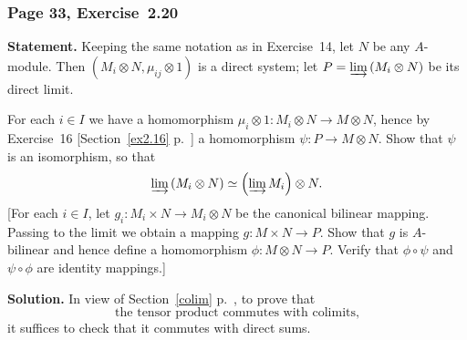 \documentclass[12pt,letterpaper]{article}%
\newcommand{\nn}{\noindent}
\begin{document}
\subsubsection{Page 33, Exercise~2.20}\label{ex2.20}%

\textbf{Statement.} Keeping the same notation as in Exercise~14, let $N$ be any $A$-module. Then $(M_i\otimes N,\mu_{ij}\otimes1)$ is a direct system; let $P=\varinjlim\,(M_i\otimes N)$ be its direct limit.

For each $i\in I$ we have a homomorphism $\mu_i\otimes1:M_i\otimes N\to M\otimes N$, hence by Exercise~16 [Section~\ref{ex2.16} p.~\pageref{ex2.16}] a homomorphism $\psi:P\to M\otimes N$. Show that $\psi$ is an isomorphism, so that
$$
\varinjlim\,(M_i\otimes N)\simeq\left(\varinjlim M_i\right)\otimes N.
$$ 
[For each $i\in I$, let $g_i:M_i\times N\to M_i\otimes N$ be the canonical bilinear mapping. Passing to the limit we obtain a mapping $g:M\times N\to P$. Show that $g$ is $A$-bilinear and hence define a homomorphism $\phi:M\otimes N\to P$. Verify that
$\phi\circ\psi$ and $\psi\circ\phi$ are identity mappings.]

\nn\textbf{Solution.} In view of Section~\ref{colim} p.~\pageref{colim}, to prove that 
\begin{equation}\label{tpcwc}
\text{the tensor product commutes with colimits,} 
\end{equation}
it suffices to check that it commutes with direct sums.
\end{document}
